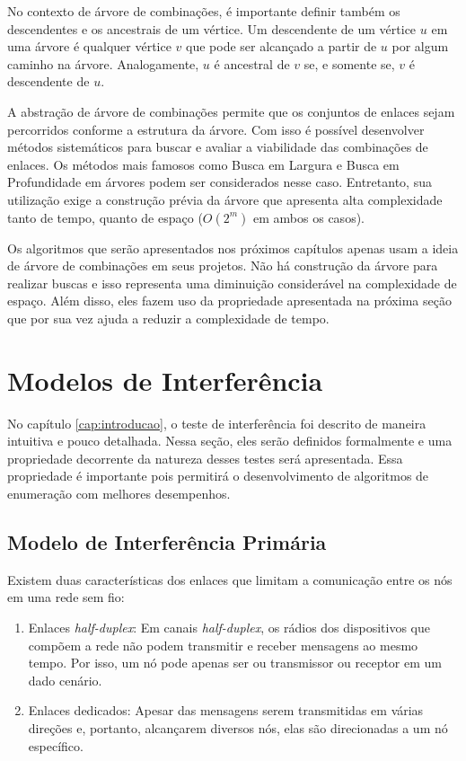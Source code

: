 No contexto de árvore de combinações, é importante definir também os descendentes e os ancestrais de um vértice. Um descendente de um vértice $u$ em uma árvore é qualquer vértice $v$ que pode ser alcançado a partir de $u$ por algum caminho na árvore. Analogamente, $u$ é ancestral de $v$ se, e somente se, $v$ é descendente de $u$. 

A abstração de árvore de combinações permite que os conjuntos de enlaces sejam percorridos conforme a estrutura da árvore. Com isso é possível desenvolver métodos sistemáticos para buscar e avaliar a viabilidade das combinações de enlaces. Os métodos mais famosos como Busca em Largura e Busca em Profundidade em árvores podem ser considerados nesse caso. Entretanto, sua utilização exige a construção prévia da árvore que apresenta alta complexidade tanto de tempo, quanto de espaço ($O(2^m)$ em ambos os casos).

Os algoritmos que serão apresentados nos próximos capítulos apenas usam a ideia de árvore de combinações em seus projetos. Não há construção da árvore para realizar buscas e isso representa uma diminuição considerável na complexidade de espaço. Além disso, eles fazem uso da propriedade apresentada na próxima seção que por sua vez ajuda a reduzir a complexidade de tempo.

\section{Modelos de Interferência}

No capítulo \ref{cap:introducao}, o teste de interferência foi descrito de maneira intuitiva e pouco detalhada. Nessa seção, eles serão definidos formalmente e uma propriedade decorrente da natureza desses testes será apresentada. Essa propriedade é importante pois permitirá o desenvolvimento de algoritmos de enumeração com melhores desempenhos.

\subsection{Modelo de Interferência Primária}

Existem duas características dos enlaces que limitam a comunicação entre os nós em uma rede sem fio: 

\begin{enumerate}

\item Enlaces {\it half-duplex}: Em canais {\it half-duplex}, os rádios dos dispositivos que compõem a rede não podem transmitir e receber mensagens ao mesmo tempo. Por isso, um nó pode apenas ser ou transmissor ou receptor em um dado cenário.
 
\item Enlaces dedicados: Apesar das mensagens serem transmitidas em várias direções e, portanto, alcançarem diversos nós, elas são direcionadas a um nó específico. 
\end{enumerate}

